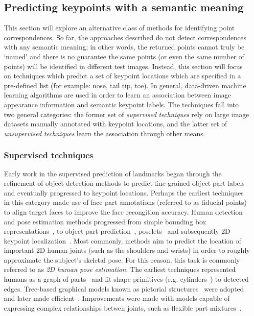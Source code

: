 \subsection{Predicting keypoints with a semantic meaning}

This section will explore an alternative class of methods for identifying point correspondences. So far, the approaches described do not detect correspondences with any semantic meaning; in other words, the returned points cannot truly be `named' and there is no guarantee the same points (or even the same number of points) will be identified in different test images. Instead, this section will focus on techniques which predict a set of keypoint locations which are specified in a pre-defined list (for example: nose, tail tip, toe). In general, data-driven machine learning algorithms are used in order to learn an association between image appearance information and semantic keypoint labels. The techniques fall into two general categories: the former set of \emph{supervised techniques} rely on large image datasets manually annotated with keypoint locations, and the latter set of \emph{unsupervised techniques} learn the association through other means. 

\subsubsection{Supervised techniques}

Early work in the supervised prediction of landmarks began through the refinement of object detection methods to predict fine-grained object part labels and eventually progressed to keypoint locations. Perhaps the earliest techniques in this category made use of face part annotations (referred to as fiducial points) to align target faces to improve the face recongition accuracy. Human detection and pose estimation methods progressed from simple bounding box representations~\cite{hog}, to object part prediction~\cite{xxx,xxx}, poselets~\cite{pose-kposelets} and subsequently 2D keypoint localization~\cite{xxx,xxx}. Most commonly, methods aim to predict the location of important 2D human joints (such as the shoulders and wrists) in order to roughly approximate the subject's skeletal pose. For this reason, this task is commonly referred to as \emph{2D human pose estimation}. The earliest techniques represented humans as a graph of parts~\cite{human-rep-parts} and fit shape primitives (e.g. cylinders~\cite{pose-hogg}) to detected edges. Tree-based graphical models known as pictorial structures~\cite{pictorial-structures} were adopted and later made efficient~\cite{pose-felzen}. Improvements were made with models capable of expressing complex relationships betwen joints, such as flexible part mixtures~\cite{yang2013articulated,pose-johnson-mixtureparts}.

